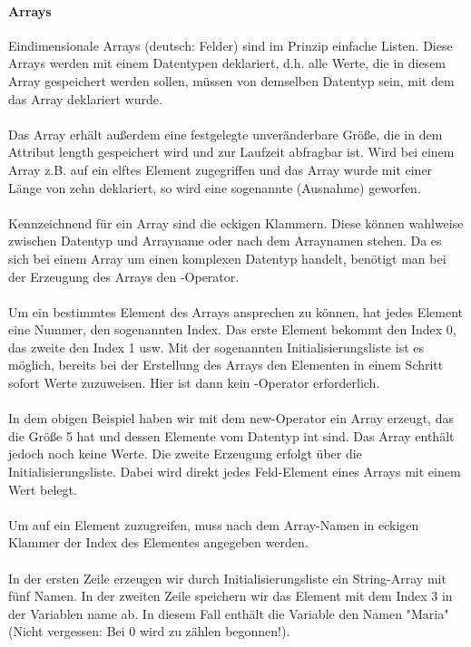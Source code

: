 \paragraph{Arrays}
Eindimensionale Arrays (deutsch: Felder) sind im Prinzip einfache Listen. Diese Arrays werden mit einem Datentypen deklariert, d.h. alle Werte, die in diesem Array gespeichert werden sollen, müssen von demselben Datentyp sein, mit dem das Array deklariert wurde.\\
\\
Das Array erhält außerdem eine festgelegte unveränderbare Größe, die in dem Attribut length gespeichert wird und zur Laufzeit abfragbar ist. Wird bei einem Array z.B. auf ein elftes Element zugegriffen und das Array wurde mit einer Länge von zehn deklariert, so wird eine sogenannte  (Ausnahme) geworfen. \\
\\
Kennzeichnend für ein Array sind die eckigen Klammern. Diese können wahlweise zwischen Datentyp und Arrayname oder nach dem Arraynamen stehen. Da es sich bei einem Array um einen komplexen Datentyp handelt, benötigt man bei der Erzeugung des Arrays den -Operator.\\
\\
Um ein bestimmtes Element des Arrays ansprechen zu können, hat jedes Element eine Nummer, den sogenannten Index. Das erste Element bekommt den Index 0, das zweite den Index 1 usw. Mit der sogenannten Initialisierungsliste ist es möglich, bereits bei der Erstellung des Arrays den Elementen in einem Schritt sofort Werte zuzuweisen. Hier ist dann kein -Operator erforderlich.\\

\ \\
In dem obigen Beispiel haben wir mit dem new-Operator ein Array erzeugt, das die Größe 5 hat und dessen Elemente vom Datentyp int sind. Das Array enthält jedoch noch keine Werte. Die zweite Erzeugung erfolgt über die  Initialisierungsliste. Dabei wird direkt jedes Feld-Element eines Arrays mit einem Wert belegt.\\
\\
Um auf ein Element zuzugreifen, muss nach dem Array-Namen in eckigen Klammer der Index des Elementes angegeben werden.\\

\ \\
In der ersten Zeile erzeugen wir durch Initialisierungsliste ein String-Array mit fünf Namen. In der zweiten Zeile speichern wir das Element mit dem Index 3 in der Variablen name ab. In diesem Fall enthält die Variable den Namen "Maria" (Nicht vergessen: Bei 0 wird zu zählen begonnen!).